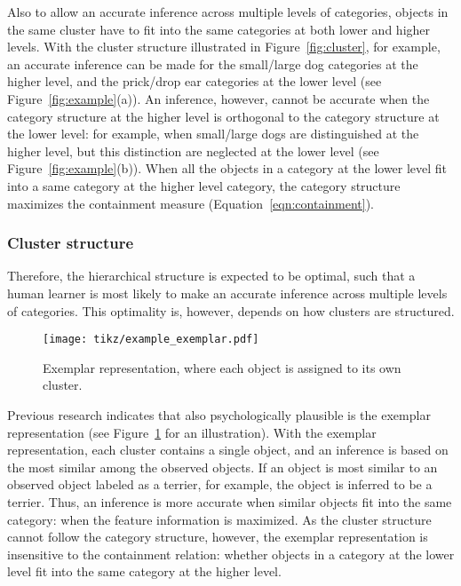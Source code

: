 \documentclass[doc]{apa6}
\begin{document}
Also to allow an accurate inference across multiple levels of categories, objects in the same
cluster have to fit into the same categories at both lower and higher levels.  With the cluster
structure illustrated in Figure~\ref{fig:cluster}, for example, an accurate inference can be made
for the small/large dog categories at the higher level, and the prick/drop ear categories at the
    lower level (see Figure~\ref{fig:example}(a)). An inference, however, cannot be accurate when
    the category structure at the higher level is orthogonal to the category structure at the lower
    level: for example, when small/large dogs are distinguished at the higher level, but this
    distinction are neglected at the lower level (see Figure~\ref{fig:example}(b)).  When all the
    objects in a category at the lower level fit into a same category at the higher level category,
    the category structure maximizes the containment measure (Equation~\ref{eqn:containment}).

\subsubsection*{Cluster structure}

Therefore, the hierarchical structure is expected to be optimal, such that a human learner is most
likely to make an accurate inference across multiple levels of categories.  This optimality is,
however, depends on how clusters are structured.

\begin{figure}
    \centering

    \texttt{[image: tikz/example\_exemplar.pdf]}
    \vspace{6pt}

    \caption{Exemplar representation, where each object is assigned to its own cluster.}

\label{fig:exemplar}
\end{figure}

Previous research indicates that also psychologically plausible is the exemplar representation
\parencite{Nosofsky1986a, Nosofsky1991a} (see Figure~\ref{fig:exemplar} for an illustration).  With
the exemplar representation, each cluster contains a single object, and an inference is based on the
most similar among the observed objects.  If an object is most similar to an observed object labeled
as a terrier, for example, the object is inferred to be a terrier.  Thus, an inference is more
accurate when similar objects fit into the same category: when the feature information is maximized.
As the cluster structure cannot follow the category structure, however, the exemplar representation
is insensitive to the containment relation: whether objects in a category at the lower level fit
into the same category at the higher level.
\end{document}
